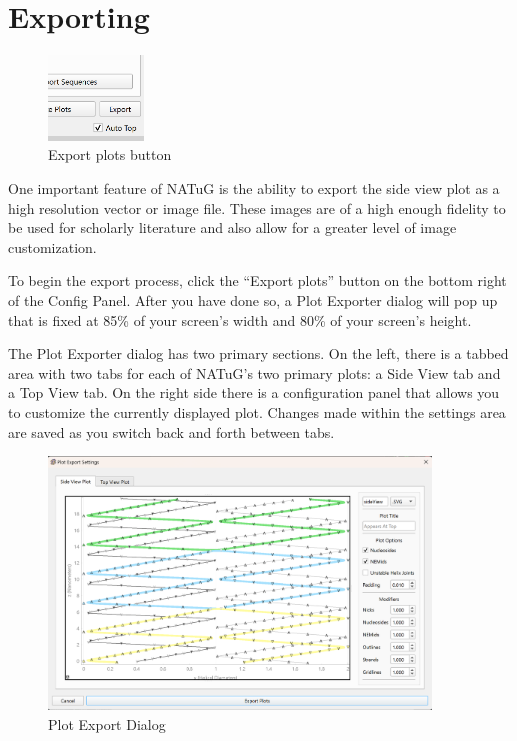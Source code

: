 \documentclass[titlepage]{article}
\begin{document}
\section{Exporting}

\begin{figure} \label{export-plots-button}
	\centering
	\caption{Export plots button}
	\includegraphics[width=1in]{export-plots-button.png}
\end{figure}

One important feature of NATuG is the ability to export the side view plot as a high resolution vector or image file. These images are of a high enough fidelity to be used for scholarly literature and also allow for a greater level of image customization.

To begin the export process, click the ``Export plots'' button on the bottom right of the Config Panel. After you have done so, a Plot Exporter dialog will pop up that is fixed at 85\% of your screen's width and 80\% of your screen's height.

The Plot Exporter dialog has two primary sections. On the left, there is a tabbed area with two tabs for each of NATuG's two primary plots: a Side View tab and a Top View tab. On the right side there is a configuration panel that allows you to customize the currently displayed plot. Changes made within the settings area are saved as you switch back and forth between tabs.

\begin{figure} \label{fig:plot-export-dialog}
	\centering
	\caption{Plot Export Dialog}
	\includegraphics[width=4in]{plot-export-dialog.png}
\end{figure}
\end{document}

